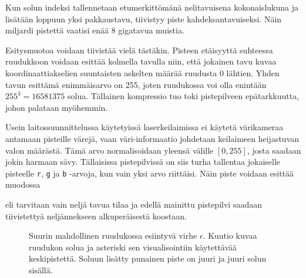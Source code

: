 
\noindent Kun solun indeksi tallennetaan etumerkittömänä nelitavuisena kokonaislukuna ja lisätään loppuun yksi pakkaustavu, tiivistyy piste kahdeksantavuiseksi. Näin miljardi pistettä vaatisi enää 8 gigatavua muistia. 

Esitysmuotoa voidaan tiivistää vielä tästäkin. Pisteen etäisyyttä suhteessa ruudukkoon voidaan esittää kolmella tavulla niin, että jokainen tavu kuvaa koordinaattiakselien suuntaisten askelten määrää ruudusta 0 lähtien. Yhden tavun esittämä enimmäisarvo on 255, joten ruudukossa voi olla enintään $255^3=16581375$ solua. Tällainen kompressio tuo toki pistepilveen epätarkkuutta, johon palataan myöhemmin. %

Usein laitossuunnittelussa käytetyissä laserkeilaimissa ei käytetä värikameraa antamaan pisteille värejä, vaan väri-informaatio johdetaan keilaimeen heijastuvan valon määrästä. Tämä arvo normalisoidaan yleensä välille $[0,255]$, josta saadaan jokin harmaan sävy. Tällaisissa pistepilvissä on siis turha tallentaa jokaiselle pisteelle \texttt{r}, \texttt{g} ja \texttt{b} -arvoja, kun vain yksi arvo riittäisi. Näin piste voidaan esittää muodossa 


\noindent eli tarvitaan vain neljä tavua tilaa ja edellä mainittu pistepilvi saadaan tiivistettyä neljännekseen alkuperäisestä koostaan. 

\begin{figure}
    \centering
    
    \caption{Suurin mahdollinen ruudukossa esiintyvä virhe $\epsilon$. Kuutio kuvaa ruudukon solua ja asteriski sen visualisointiin käytettävää keskipistettä. Soluun lisätty punainen piste on juuri ja juuri solun sisällä.}
    \label{errorkuva}
\end{figure}

